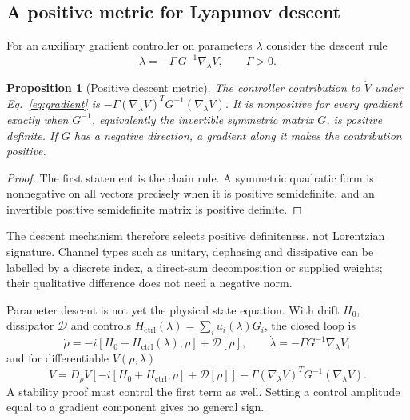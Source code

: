 \documentclass[aps,pre,onecolumn,superscriptaddress,floatfix,longbibliography]{revtex4-2}
\newtheorem{proposition}[theorem]{Proposition}
\begin{document}
\subsection{A positive metric for Lyapunov descent}
\label{sec:metric}

For an auxiliary gradient controller on parameters $\lambda$ consider the descent rule
\begin{equation}
\dot{\lambda} = -\Gamma\, G^{-1} \nabla_\lambda V,\qquad \Gamma>0.
\label{eq:gradient}
\end{equation}

\begin{proposition}[Positive descent metric]
\label{prop:descent}
The controller contribution to $\dot V$ under Eq.~\eqref{eq:gradient} is $-\Gamma(\nabla_\lambda V)^TG^{-1}(\nabla_\lambda V)$. It is nonpositive for every gradient exactly when $G^{-1}$, equivalently the invertible symmetric matrix $G$, is positive definite. If $G$ has a negative direction, a gradient along it makes the contribution positive.
\end{proposition}

\begin{proof}
The first statement is the chain rule. A symmetric quadratic form is nonnegative on all vectors precisely when it is positive semidefinite, and an invertible positive semidefinite matrix is positive definite.
\end{proof}

The descent mechanism therefore selects positive definiteness, not Lorentzian signature. Channel types such as unitary, dephasing and dissipative can be labelled by a discrete index, a direct-sum decomposition or supplied weights; their qualitative difference does not need a negative norm.

Parameter descent is not yet the physical state equation. With drift $H_0$, dissipator $\mathcal D$ and controls $H_{\mathrm{ctrl}}(\lambda)=\sum_i u_i(\lambda)G_i$, the closed loop is
\begin{equation}
\dot\rho= -i[H_0+H_{\mathrm{ctrl}}(\lambda),\rho]+\mathcal D[\rho],
\qquad
\dot\lambda=-\Gamma G^{-1}\nabla_\lambda V,
\end{equation}
and for differentiable $V(\rho,\lambda)$
\begin{equation}
\dot V=D_\rho V\!\left[-i[H_0+H_{\mathrm{ctrl}},\rho]+\mathcal D[\rho]\right]
-\Gamma(\nabla_\lambda V)^TG^{-1}(\nabla_\lambda V).
\label{eq:fullVdot}
\end{equation}
A stability proof must control the first term as well. Setting a control amplitude equal to a gradient component gives no general sign.
\end{document}
